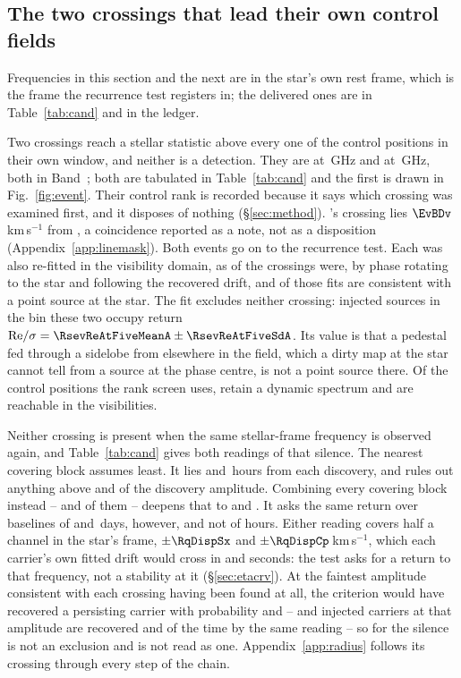 \subsection{The two crossings that lead their own control fields}
\label{sec:vistest}

Frequencies in this section and the next are in the star's own rest frame,
which is the frame the recurrence test registers in; the delivered ones are in
Table~\ref{tab:cand} and in the ledger.

Two crossings reach a stellar statistic above every one of the \NCtrl{}
control positions in their own window, and neither is a detection. They are
\EvAStar{} at \RqFreqSx\,GHz and \EvBStar{} at \RqFreqCp\,GHz, both in
Band~\EvABand; both are tabulated in Table~\ref{tab:cand} and the first is
drawn in Fig.~\ref{fig:event}. Their control rank is recorded because it says which crossing was examined
first, and it disposes of nothing (\S\ref{sec:method}).
\EvBStar's crossing lies $\EvBDv$\,km\,s$^{-1}$ from \EvBLine, a coincidence
reported as a note, not as a disposition
(Appendix~\ref{app:linemask}). Both events go on to the recurrence test. Each was also re-fitted in the visibility domain, as \LgNFit{} of the
\NCross{} crossings were, by phase rotating to the star and following the
recovered drift, and \LgNLocalCor{} of those fits are consistent with a point
source at the star. The fit excludes neither crossing: injected sources in
the bin these two occupy return
${\rm Re}/\sigma=\RsevReAtFiveMeanA\pm\RsevReAtFiveSdA$. Its value is that a pedestal fed through a sidelobe from elsewhere in
the field, which a dirty map at the star cannot tell from a source at the
phase centre, is not a point source there. Of the \NCtrl{} control positions
the rank screen uses, \RcNRetCtrl{} retain a dynamic spectrum and
\RcNVisCtrl{} are reachable in the visibilities.

Neither crossing is present when the same stellar-frame frequency is observed
again, and Table~\ref{tab:cand} gives both readings of that silence. The nearest covering block assumes least. It lies \RcSxNearH{} and
\EvBDeepH\,hours from each discovery, and rules out anything above
\RqNearFracSx{} and \RqNearFracCp{} of the discovery amplitude. Combining every covering block instead -- \RqNRepSx{} and \RqNRepCp{} of
them -- deepens that to \RcSxFive{} and \RcCpFive. It asks the same return
over baselines of \RqSpanDSx{} and \RqSpanDCp\,days, however, and not of
hours. Either
reading covers half a channel in the star's frame, $\pm\RqDispSx$ and
$\pm\RqDispCp$\,km\,s$^{-1}$, which each carrier's own fitted drift would
cross in \ZtSxLeaveSec{} and \ZtCpLeaveSec{} seconds: the
test asks for a return to that frequency, not a stability at
it (\S\ref{sec:etacrv}). At the faintest amplitude consistent with each crossing
having been found at all, the criterion would have recovered a persisting
carrier with probability \RqPowerTrigSx{} and \RqPowerTrigCp{} -- and
injected carriers at that amplitude are recovered \RjMeasSx{} and
\RjMeasCp{} of the time by the same reading -- so for
\EvBStar{} the silence is not an exclusion and is not read as one.
Appendix~\ref{app:radius} follows its crossing through every step
of the chain.


